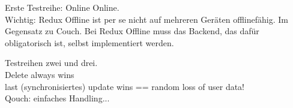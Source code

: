 Erste Testreihe: Online Online.\\

Wichtig: Redux Offline ist per se nicht auf mehreren Geräten offlinefähig.
Im Gegensatz zu Couch. Bei Redux Offline muss das Backend, das dafür obligatorisch ist, selbst implementiert werden.

Testreihen zwei und drei.\\
Delete always wins\\
last (synchronisiertes) update wins == random loss of user data!\\
Qouch: einfaches Handling...
%
